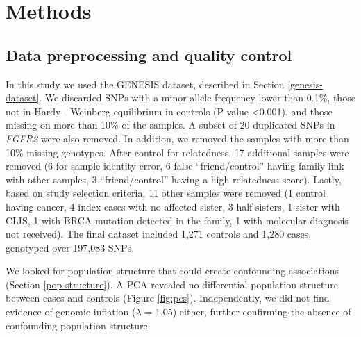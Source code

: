\documentclass[
  11pt,
]{env/yjiao}
\begin{document}
\hypertarget{methods}{%
\section{Methods}\label{methods}}

\hypertarget{data-preprocessing-and-quality-control}{%
\subsection{Data preprocessing and quality control}\label{data-preprocessing-and-quality-control}}

In this study we used the GENESIS dataset, described in Section \ref{genesis-dataset}.
We discarded SNPs with a minor allele frequency lower than 0.1\%, those
not in Hardy - Weinberg equilibrium in controls (P-value \textless0.001), and
those missing on more than 10\% of the samples. A subset of 20 duplicated
SNPs in \emph{FGFR2} were also removed. In addition, we removed the samples
with more than 10\% missing genotypes. After control for relatedness, 17
additional samples were removed (6 for sample identity error, 6 false
``friend/control'' having family link with other samples, 3 ``friend/control''
having a high relatedness score). Lastly, based on study selection criteria,
11 other samples were removed (1 control having cancer, 4 index cases with no
affected sister, 3 half-sisters, 1 sister with CLIS, 1 with BRCA mutation
detected in the family, 1 with molecular diagnosis not received). The final
dataset included 1,271 controls and 1,280 cases, genotyped over 197,083 SNPs.

We looked for population structure that could create confounding
associations (Section \ref{pop-structure}). A PCA revealed no differential
population structure between cases and controls (Figure \ref{fig:pcs}).
Independently, we did not find evidence of genomic inflation (\(\lambda\)
= 1.05) either, further confirming the absence of confounding population
structure.
\end{document}
